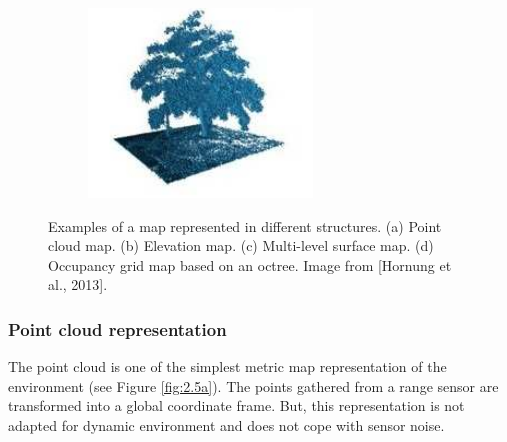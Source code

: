\documentclass[11pt,openany]{book}
\begin{document}
\begin{figure}[H]
\begin{subfigure}[H]{0.4\linewidth}
    \end{subfigure}
    \begin{subfigure}[H]{0.4\linewidth}
        \centering
        \includegraphics[width=\linewidth]{assets/2_5_d.png}
        \caption{{}}
        \label{fig:2.5d}
    \end{subfigure}
    \caption{Examples of a map represented in diﬀerent structures. (a) Point cloud map. (b) Elevation map. (c) Multi-level surface map. (d) Occupancy grid map based on an octree. Image from [Hornung et al., 2013].}
    \label{fig:2.5}
\end{figure}
\subsubsection{Point cloud representation}
The point cloud is one of the simplest metric map representation of the environment (see Figure \ref{fig:2.5a}). The points gathered from a range sensor are transformed into a global coordinate frame. But, this representation is not adapted for dynamic environment and does not cope with sensor noise.
\end{document}
